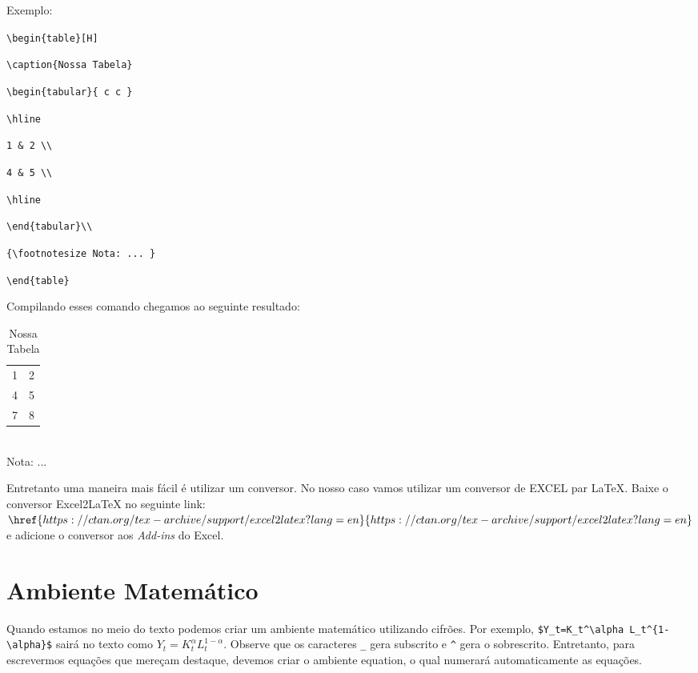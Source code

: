 \documentclass[12pt,oneside,a4paper,chapter=TITLE,english,brazil,sumario=abnt-6027-2012]{abntex2}
\begin{document}
\vspace{0.2cm}

Exemplo:

\verb|\begin{table}[H]|

\verb|\caption{Nossa Tabela}|

\verb|\begin{tabular}{ c c }|

\verb|\hline|

\verb|1 & 2 \\|

\verb|4 & 5 \\|

\verb|\hline|

\verb|\end{tabular}\\|

\verb|{\footnotesize Nota: ... }|

\verb|\end{table}|

\vspace{0.2cm}

Compilando esses comando chegamos ao seguinte resultado: 

\vspace{0.2cm}

\begin{table}[H]
	\caption{Nossa Tabela}
	\begin{tabular}{ c  c }
		\hline
		1 & 2 \\
		4 & 5 \\
		7 & 8 \\
		\hline
	\end{tabular}\\
	{\footnotesize Nota: ... }
\end{table}
\vspace{0.5cm}

Entretanto uma maneira mais fácil é utilizar um conversor.  No nosso caso vamos utilizar um conversor de EXCEL par {\LaTeX}. Baixe o conversor Excel2LaTeX no seguinte link: {$\href{https://ctan.org/tex-archive/support/excel2latex?lang=en}{https://ctan.org/tex-archive/support/excel2latex?lang=en}$} e adicione o conversor aos \textit{Add-ins} do Excel. 


\section{Ambiente Matemático}

Quando estamos no meio do texto podemos criar um ambiente matemático utilizando cifrões. Por exemplo, \verb|$Y_t=K_t^\alpha L_t^{1-\alpha}$| sairá no texto como $Y_t=K_t^\alpha L_t^{1-\alpha}$. Observe que os caracteres \verb|_| gera subscrito e \verb|^| gera o sobrescrito. Entretanto, para escrevermos equações que mereçam destaque, devemos criar o ambiente equation, o qual numerará automaticamente as equações.  
\end{document}
